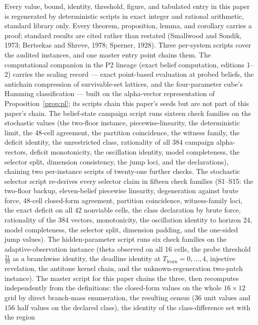 \documentclass[10pt,twocolumn]{article}
\theoremstyle{plain}
\theoremstyle{definition}
\theoremstyle{remark}
\begin{document}
Every value, bound, identity, threshold, figure, and tabulated entry in
this paper is regenerated by deterministic scripts in exact integer and
rational arithmetic, standard library only. Every theorem, proposition,
lemma, and corollary carries a proof; standard results are cited rather
than restated (Smallwood and Sondik, 1973; Bertsekas and Shreve, 1978;
Sperner, 1928). Three per-system scripts
cover the audited instances, and one master entry point chains them.
The computational companion in the P2 lineage (exact belief
computation, editions 1--2) carries the scaling record --- exact
point-based evaluation at probed beliefs, the antichain compression of
survivable-set lattices, and the four-parameter cube's Hamming
classification --- built on the alpha-vector representation of
Proposition~\ref{prop:pl}; its scripts chain this paper's seeds but
are not part of this paper's chain.
The belief-state campaign script runs sixteen check families on the
stochastic values (the two-floor instance, piecewise-linearity, the
deterministic limit, the 48-cell agreement, the partition coincidence,
the witness family, the deficit identity, the unrestricted class,
rationality of all 384 campaign alpha-vectors, deficit monotonicity, the
oscillation identity, model completeness, the selector split, dimension
consistency, the jump loci, and the declarations), chaining two
per-instance scripts of twenty-one further checks. The stochastic
selector script re-derives every selector claim in fifteen check
families (S1--S15: the two-floor backup, eleven-belief piecewise
linearity, degeneration against brute force, 48-cell closed-form
agreement, partition coincidence, witness-family loci, the exact
deficit on all 42 nonviable cells, the class declaration by brute
force, rationality of the 384 vectors, monotonicity, the oscillation
identity to horizon 24, model completeness, the selector split,
dimension padding, and the one-sided jump values). The hidden-parameter
script runs six check families on the adaptive-observation instance
(theta observed on all 16 cells, the probe threshold
\(\tfrac{21}{10}\) as a branchwise identity, the deadline identity at
\(T_{\mathrm{learn}} = 0, \dots, 4\), injective revelation, the
antitone kernel chain, and the unknown-regeneration two-patch
instance). The master script for this paper chains the three, then
recomputes independently from the definitions: the closed-form values on
the whole \(16 \times 12\) grid by direct branch-mass enumeration, the
resulting census (\(36\) unit values and \(156\) half values on the
declared class), the identity of the class-difference set with the region
\end{document}
